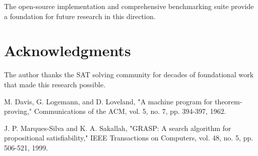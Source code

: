 \documentclass[conference]{IEEEtran}
\begin{document}
The open-source implementation and comprehensive benchmarking suite provide a foundation for future research in this direction.

\section*{Acknowledgments}

The author thanks the SAT solving community for decades of foundational work that made this research possible.

\begin{thebibliography}{9}

M. Davis, G. Logemann, and D. Loveland, "A machine program for theorem-proving," Communications of the ACM, vol. 5, no. 7, pp. 394-397, 1962.

J. P. Marques-Silva and K. A. Sakallah, "GRASP: A search algorithm for propositional satisfiability," IEEE Transactions on Computers, vol. 48, no. 5, pp. 506-521, 1999.

\end{thebibliography}
\end{document}
